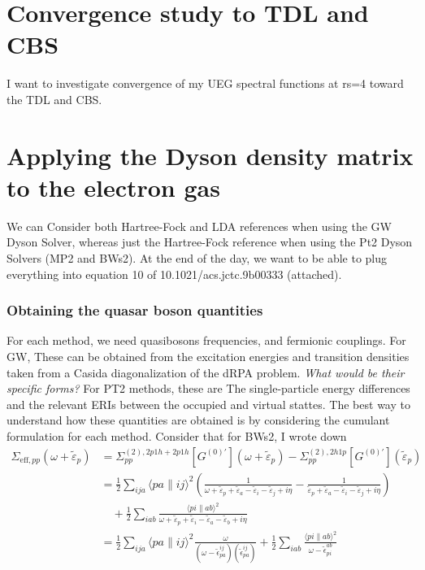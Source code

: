 \section{Convergence study to TDL and CBS}
I want to investigate convergence of my UEG spectral functions at rs=4 toward the TDL and CBS.
\section{Applying the Dyson density matrix to the electron gas }
We can Consider both Hartree-Fock and LDA references when using the GW Dyson Solver, whereas just the Hartree-Fock reference when using the Pt2 Dyson Solvers (MP2 and BWs2). At the end of the day, we want to be able to plug everything into equation 10 of 10.1021/acs.jctc.9b00333 (attached).
\subsubsection{Obtaining the quasar boson quantities }
For each method, we need quasibosons frequencies, and fermionic couplings. For GW, These can be obtained from the excitation energies and transition densities taken from a Casida diagonalization of the dRPA problem. \emph{What would be their specific forms? }
For PT2 methods, these are The single-particle energy differences and the relevant ERIs between the occupied and virtual stattes. The best way to understand how these quantities are obtained is by considering the cumulant formulation for each method. Consider that for BWs2, I wrote down
\begin{align}
\Sigma_{\mathrm{eff},pp}(\omega + \tilde{\varepsilon}_p) &=
\Sigma_{pp}^{(2),2p1h+2p1h}\!\left[ G^{(0)'} \right](\omega + \tilde{\varepsilon}_p)
- \Sigma_{pp}^{(2),2h1p}\!\left[ G^{(0)'} \right](\tilde{\varepsilon}_p)\\
&= \frac{1}{2} \sum_{ija} \langle p a \| i j\rangle^2 \left( \frac{1}{\omega + \tilde{\varepsilon}_p+ \tilde{\varepsilon}_a  - \tilde{\varepsilon}_i - \tilde{\varepsilon}_j +i\eta} - \frac{1}{\tilde{\varepsilon}_p  + \tilde{\varepsilon}_a - \tilde{\varepsilon}_i - \tilde{\varepsilon}_j +i\eta} \right)\\
&\quad + \frac{1}{2} \sum_{iab} \frac{\langle p i \| a b\rangle^2}{\omega + \tilde{\varepsilon}_p + \tilde{\varepsilon}_i - \tilde{\varepsilon}_a - \tilde{\varepsilon}_b +i\eta} \\
&= \frac{1}{2} \sum_{ija} \langle p a \| i j\rangle^2 \frac{\omega}{(\omega - \tilde\epsilon_{pa}^{ij})(\tilde\epsilon_{pa}^{ij})} + \frac{1}{2} \sum_{iab} \frac{\langle p i \| a b\rangle^2}{\omega - \tilde\epsilon_{pi}^{ab}}
\end{align}
